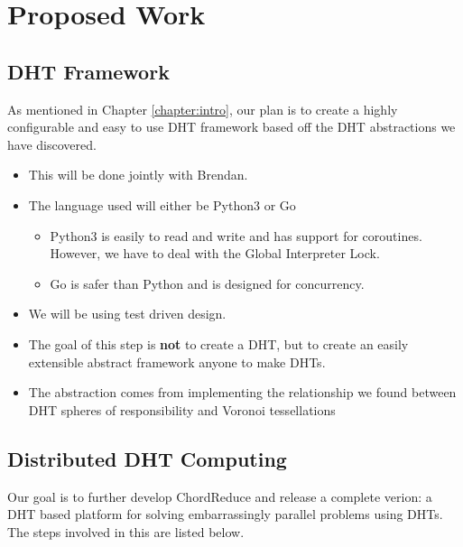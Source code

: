 \chapter{Proposed Work}
\label{chapter:experiments}


\section{DHT Framework}
As mentioned in Chapter \ref{chapter:intro}, our plan is to create a highly configurable and easy to use DHT framework based off the DHT abstractions we have discovered.

\begin{itemize}
	\item This will be done jointly with Brendan.
	\item The language used will either be Python3 or Go
	\begin{itemize}
		\item Python3 is easily to read and write and has support for coroutines.  However, we have to deal with the Global Interpreter Lock.
		\item Go is safer than Python and is designed for concurrency.
	\end{itemize}
	\item We will be using test driven design.
	\item The goal of this step is \textbf{not} to create a DHT, but to create an easily extensible abstract framework anyone to make DHTs.
	\item The abstraction comes from implementing the relationship we found between DHT spheres of responsibility and Voronoi tessellations
	
\end{itemize}


\section{Distributed DHT Computing}




Our goal is to further develop ChordReduce and release a complete verion: a DHT based platform for solving embarrassingly parallel problems using DHTs.
The steps involved in this are listed below.

